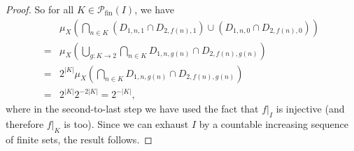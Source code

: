 \documentclass{lmcs}
\newcommand{\pfin}{\ensuremath{\powerset_{\mathrm{fin}}}}
\newcommand{\powerset}{\ensuremath{\mathcal{P}}}
\begin{document}
\begin{proof}
So for all $K \in \pfin(I)$, we have
\begin{align*}
& \mu_X\left(\bigcap_{n \in K} (D_{1,n,1} \cap D_{2,f(n),1}) \cup (D_{1,n,0} \cap D_{2,f(n),0})\right) \\ 
={} &  \mu_X\left(\bigcup_{g : K \rightarrow 2} \bigcap_{n \in K} D_{1,n,g(n)} \cap D_{2,f(n),g(n)}\right) \\
={} & 2^{|K|} \mu_X\left(\bigcap_{n \in K} D_{1,n,g(n)} \cap D_{2,f(n),g(n)}\right) \\
={} &  2^{|K|} 2^{-2|K|} = 2^{-|K|},
\end{align*}
where in the second-to-last step we have used the fact that $f|_I$ is injective (and therefore $f|_K$ is too). Since we can exhaust $I$ by a countable increasing sequence of finite sets, the result follows. 
\end{proof}

\end{document}
